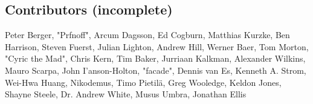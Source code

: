 \subsection{Contributors (incomplete)}

Peter Berger, "Prfnoff", Arcum Dagsson, Ed Cogburn, Matthias Kurzke,
Ben Harrison, Steven Fuerst, Julian Lighton, Andrew Hill, Werner Baer,
Tom Morton, "Cyric the Mad", Chris Kern, Tim Baker, Jurriaan Kalkman,
Alexander Wilkins, Mauro Scarpa, John I'anson-Holton, "facade",
Dennis van Es, Kenneth A. Strom, Wei-Hwa Huang, Nikodemus, Timo Pietil\"{a},
Greg Wooledge, Keldon Jones, Shayne Steele, Dr. Andrew White, Musus Umbra,
Jonathan Ellis


